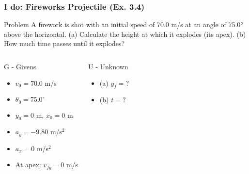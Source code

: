 \documentclass{beamer}
\begin{document}
\begin{frame}
\frametitle{I do: Fireworks Projectile (Ex. 3.4)}
\begin{block}{Problem}
A firework is shot with an initial speed of 70.0 m/s at an angle of 75.0° above the horizontal. (a) Calculate the height at which it explodes (its apex). (b) How much time passes until it explodes?
\end{block}
\pause
\begin{columns}[T]
\begin{block}{G - Givens}
\begin{itemize}
\item $v_0 = 70.0$ m/s
\item $\theta_0 = 75.0^\circ$
\item $y_0 = 0$ m, $x_0 = 0$ m
\item $a_y = -9.80$ m/s$^2$
\item $a_x = 0$ m/s$^2$
\item At apex: $v_{fy} = 0$ m/s
\end{itemize}
\end{block}
\pause
{}
\begin{block}{U - Unknown}
\begin{itemize}
\item (a) $y_f = ?$
\item (b) $t = ?$
\end{itemize}
\end{block}
\end{columns}
\end{frame}
\end{document}
